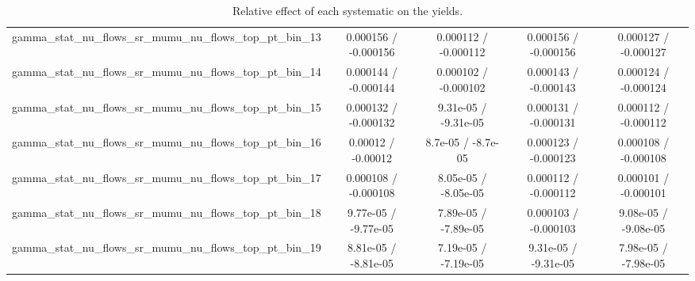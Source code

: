 \documentclass[10pt]{article}
\begin{document}
\begin{table}[htbp]
\begin{center}
\begin{tabular}{|c|c|c|c|c|}
  gamma_stat_nu_flows_sr_mumu_nu_flows_top_pt_bin_13 & 0.000156 / -0.000156 & 0.000112 / -0.000112 & 0.000156 / -0.000156 & 0.000127 / -0.000127 \\ 
  gamma_stat_nu_flows_sr_mumu_nu_flows_top_pt_bin_14 & 0.000144 / -0.000144 & 0.000102 / -0.000102 & 0.000143 / -0.000143 & 0.000124 / -0.000124 \\ 
  gamma_stat_nu_flows_sr_mumu_nu_flows_top_pt_bin_15 & 0.000132 / -0.000132 & 9.31e-05 / -9.31e-05 & 0.000131 / -0.000131 & 0.000112 / -0.000112 \\ 
  gamma_stat_nu_flows_sr_mumu_nu_flows_top_pt_bin_16 & 0.00012 / -0.00012 & 8.7e-05 / -8.7e-05 & 0.000123 / -0.000123 & 0.000108 / -0.000108 \\ 
  gamma_stat_nu_flows_sr_mumu_nu_flows_top_pt_bin_17 & 0.000108 / -0.000108 & 8.05e-05 / -8.05e-05 & 0.000112 / -0.000112 & 0.000101 / -0.000101 \\ 
  gamma_stat_nu_flows_sr_mumu_nu_flows_top_pt_bin_18 & 9.77e-05 / -9.77e-05 & 7.89e-05 / -7.89e-05 & 0.000103 / -0.000103 & 9.08e-05 / -9.08e-05 \\ 
  gamma_stat_nu_flows_sr_mumu_nu_flows_top_pt_bin_19 & 8.81e-05 / -8.81e-05 & 7.19e-05 / -7.19e-05 & 9.31e-05 / -9.31e-05 & 7.98e-05 / -7.98e-05 \\ 
\hline 
\end{tabular} 
\caption{Relative effect of each systematic on the yields.} 
\end{center} 
\end{table} 
\end{document}
